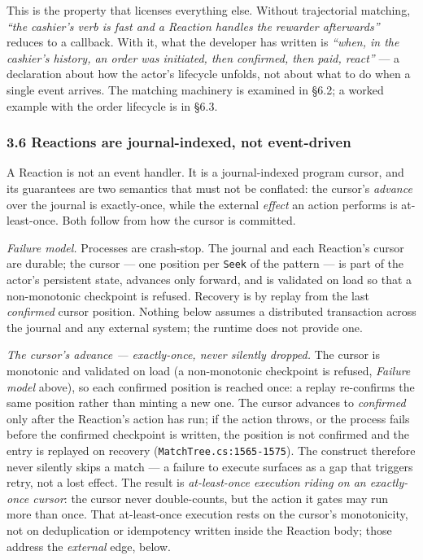 \documentclass[
]{article}
\let\origtexttt\texttt%
\renewcommand{\texttt}[1]{\origtexttt{\seqsplit{#1}}}%
\let\texttt\origtexttt%
\begin{document}
This is the property that licenses everything else. Without trajectorial
matching, \emph{``the cashier's verb is fast and a Reaction handles the
rewarder afterwards''} reduces to a callback. With it, what the
developer has written is \emph{``when, in the cashier's history, an
order was initiated, then confirmed, then paid, react''} --- a
declaration about how the actor's lifecycle unfolds, not about what to
do when a single event arrives. The matching machinery is examined in
§6.2; a worked example with the order lifecycle is in §6.3.

\subsubsection{3.6 Reactions are journal-indexed, not
event-driven}\label{reactions-are-journal-indexed-not-event-driven}

A Reaction is not an event handler. It is a journal-indexed program
cursor, and its guarantees are two semantics that must not be conflated:
the cursor's \emph{advance} over the journal is exactly-once, while the
external \emph{effect} an action performs is at-least-once. Both follow
from how the cursor is committed.

\emph{Failure model.} Processes are crash-stop. The journal and each
Reaction's cursor are durable; the cursor --- one position per
\texttt{Seek} of the pattern --- is part of the actor's persistent
state, advances only forward, and is validated on load so that a
non-monotonic checkpoint is refused. Recovery is by replay from the last
\emph{confirmed} cursor position. Nothing below assumes a distributed
transaction across the journal and any external system; the runtime does
not provide one.

\emph{The cursor's advance --- exactly-once, never silently dropped.}
The cursor is monotonic and validated on load (a non-monotonic
checkpoint is refused, \emph{Failure model} above), so each confirmed
position is reached once: a replay re-confirms the same position rather
than minting a new one. The cursor advances to \emph{confirmed} only
after the Reaction's action has run; if the action throws, or the
process fails before the confirmed checkpoint is written, the position
is not confirmed and the entry is replayed on recovery
(\texttt{MatchTree.cs:1565-1575}). The construct therefore never
silently skips a match --- a failure to execute surfaces as a gap that
triggers retry, not a lost effect. The result is \emph{at-least-once
execution riding on an exactly-once cursor}: the cursor never
double-counts, but the action it gates may run more than once. That
at-least-once execution rests on the cursor's monotonicity, not on
deduplication or idempotency written inside the Reaction body; those
address the \emph{external} edge, below.
\end{document}
